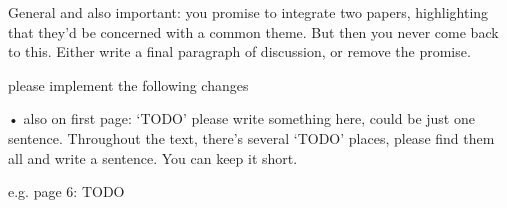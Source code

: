 General and also important: you promise to integrate two papers, highlighting that they’d be concerned with a common theme. But then you never come back to this. Either write a final paragraph of discussion, or remove the promise. 


please implement the following changes





• also on first page: ‘TODO’ please write something here, could be just one sentence. Throughout the text, there’s several ‘TODO’ places, please find them all and write a sentence. You can keep it short. 

e.g. page 6: TODO



